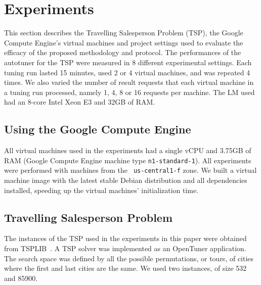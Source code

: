 \section{Experiments} \label{sec:exp}

This section describes the Travelling Salesperson Problem (TSP), the Google
Compute Engine's virtual machines and project settings used to evaluate the
efficacy of the proposed methodology and protocol.  The performances of
the autotuner for the TSP were measured in 8 different
experimental settings. Each tuning run lasted 15 minutes, used 2 or 4
virtual machines, and was repeated 4 times.  We also varied the number of
result requests that each virtual machine in a tuning run processed, namely 1,
4, 8 or 16 requests per machine.
The LM used had an 8-core Intel Xeon E3 and 32GB of RAM.

\subsection{Using the Google Compute Engine}

All virtual machines used in the experiments had a single vCPU and 3.75GB of
RAM (Google Compute Engine machine type \texttt{\footnotesize n1-standard-1}).
All experiments were performed with machines from the \texttt{\footnotesize
us-central1-f} zone. We built a virtual machine image with the latest stable
Debian distribution and all dependencies installed, speeding up the virtual
machines' initialization time.

\subsection{Travelling Salesperson Problem}

The instances of the TSP used in the experiments in this paper were obtained
from TSPLIB~\cite{reinelt1991tsplib}.  A TSP solver was implemented as an
OpenTuner application. The search space was defined by all the possible
permutations, or tours, of cities where the first and last cities are the same.
We used two instances, of size 532 and 85900.
